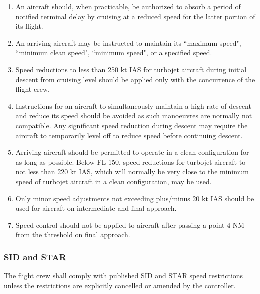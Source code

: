 \begin{enumerate}
    \item An aircraft should, when practicable, be authorized to absorb a period of notified terminal delay by cruising at a reduced speed for the latter portion of its flight.
    \item An arriving aircraft may be instructed to maintain its ``maximum speed", ``minimum clean speed", ``minimum speed", or a specified speed.
    \item Speed reductions to less than 250 kt IAS for turbojet aircraft during initial descent from cruising level should be applied only with the concurrence of the flight crew.
    \item Instructions for an aircraft to simultaneously maintain a high rate of descent and reduce its speed should be avoided as such manoeuvres are normally not compatible. Any significant speed reduction during descent may require the aircraft to temporarily level off to reduce speed before continuing descent.
    \item Arriving aircraft should be permitted to operate in a clean configuration for as long as possible. Below FL 150, speed reductions for turbojet aircraft to not less than 220 kt IAS, which will normally be very close to the minimum speed of turbojet aircraft in a clean configuration, may be used.
    \item Only minor speed adjustments not exceeding plus/minus 20 kt IAS should be used for aircraft on intermediate and final approach.
    \item Speed control should not be applied to aircraft after passing a point 4 NM from the threshold on final approach.
\end{enumerate}

\subsubsection{SID and STAR}

The flight crew shall comply with published SID and STAR speed restrictions unless the restrictions are explicitly cancelled or amended by the controller.

